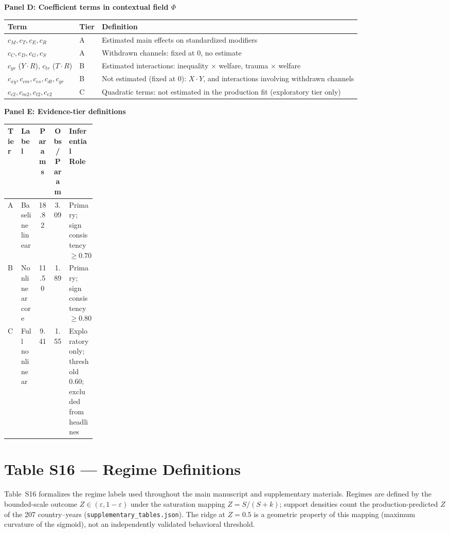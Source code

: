 \documentclass[11pt]{article}
\begin{document}
\vspace{12pt}
\noindent\textbf{Panel D: Coefficient terms in contextual field $\Phi$}
\vspace{4pt}

\begin{tabularx}{\linewidth}{@{}l l >{\raggedright\arraybackslash}X@{}}
\toprule
Term & Tier & Definition \\
\midrule
$c_M, c_T, c_E, c_R$ & A & Estimated main effects on standardized modifiers \\
$c_C, c_D, c_G, c_S$ & A & Withdrawn channels: fixed at 0, no estimate \\
$c_{yr}$ ($Y{\cdot}R$), $c_{tr}$ ($T{\cdot}R$) & B & Estimated interactions: inequality $\times$ welfare, trauma $\times$ welfare \\
$c_{xy}, c_{cm}, c_{es}, c_{dt}, c_{gr}$ & B & Not estimated (fixed at 0): $X{\cdot}Y$, and interactions involving withdrawn channels \\
$c_{c2}, c_{m2}, c_{t2}, c_{e2}$ & C & Quadratic terms: not estimated in the production fit (exploratory tier only) \\
\bottomrule
\end{tabularx}

\vspace{12pt}
\noindent\textbf{Panel E: Evidence-tier definitions}
\vspace{4pt}

\begin{tabularx}{\linewidth}{@{}l >{\raggedright\arraybackslash}p{0.20\linewidth} c c >{\raggedright\arraybackslash}X@{}}
\toprule
Tier & Label & Params & Obs/Param & Inferential Role \\
\midrule
A & Baseline linear & 18.82 & 3.09 & Primary; sign consistency $\geq 0.70$ \\
B & Nonlinear core & 11.50 & 1.89 & Primary; sign consistency $\geq 0.80$ \\
C & Full nonlinear & 9.41 & 1.55 & Exploratory only; threshold 0.60; excluded from headlines \\
\bottomrule
\end{tabularx}

\endgroup

\section*{Table S16 --- Regime Definitions}

\noindent\justifying
Table~S16 formalizes the regime labels used throughout the main manuscript and supplementary materials.
Regimes are defined by the bounded-scale outcome $Z \in (\varepsilon, 1{-}\varepsilon)$ under the saturation mapping $Z = S/(S+k)$; support densities count the production-predicted $Z$ of the 207 country--years (\nolinkurl{supplementary_tables.json}).
The ridge at $Z{=}0.5$ is a geometric property of this mapping (maximum curvature of the sigmoid), not an independently validated behavioral threshold.
\end{document}
